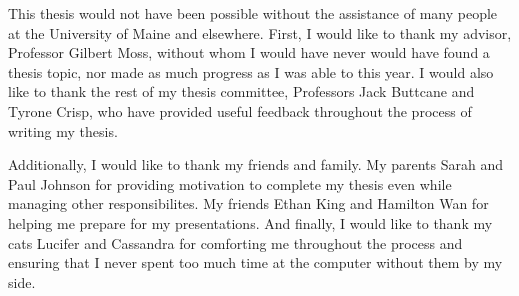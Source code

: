 
\begin{acknowledgements}
  This thesis would not have been possible without the assistance of many people at the University of Maine and elsewhere.
  First, I would like to thank my advisor, Professor Gilbert Moss, without whom I would have never would have found a thesis topic, nor made as much progress as I was able to this year.
  I would also like to thank the rest of my thesis committee, Professors Jack Buttcane and Tyrone Crisp, who have provided useful feedback throughout the process of writing my thesis.

  Additionally, I would like to thank my friends and family.
  My parents Sarah and Paul Johnson for providing motivation to complete my thesis even while managing other responsibilites.
  My friends Ethan King and Hamilton Wan for helping me prepare for my presentations.
  And finally, I would like to thank my cats Lucifer and Cassandra for comforting me throughout the process and ensuring that I never spent too much time at the computer without them by my side.
\end{acknowledgements}

\tableofcontents


\mainmatter

\endinput
